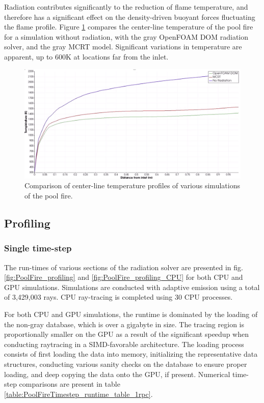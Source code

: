Radiation contributes significantly to the reduction of flame temperature, and therefore has a significant effect on the density-driven buoyant forces fluctuating the flame profile. 
Figure \ref{fig:PoolFire_withandwithoutrad} compares the center-line temperature of the pool fire for a simulation without radiation, with the gray OpenFOAM DOM radiation solver, and the gray MCRT model. Significant variations in temperature are apparent, up to $600$K at locations far from the inlet.


\begin{figure}
\centering
\includegraphics[width=1\linewidth]{figures/ch4/PoolFire_WithandWithoutRadiation.png}
\caption{Comparison of center-line temperature profiles of various simulations of the pool fire.}
\label{fig:PoolFire_withandwithoutrad}
\end{figure}

\subsection{Profiling}
\subsubsection{Single time-step}
The run-times of various sections of the radiation solver are presented in fig. \ref{fig:PoolFire_profiling} and \ref{fig:PoolFire_profiling_CPU} for both CPU and GPU simulations. Simulations are conducted with adaptive emission using a total of 3,429,003 rays.
CPU ray-tracing is completed using 30 CPU processes. 

For both CPU and GPU simulations, the runtime is dominated by the loading of the non-gray database, which is over a gigabyte in size. 
The tracing region is proportionally smaller on the GPU as a result of the significant speedup when conducting raytracing in a SIMD-favorable architecture.
The loading process consists of first loading the data into memory, initializing the representative data structures, conducting various sanity checks on the database to ensure proper loading, and deep copying the data onto the GPU, if present.
Numerical time-step comparisons are present in table \ref{table:PoolFireTimestep_runtime_table_1rpc}.

